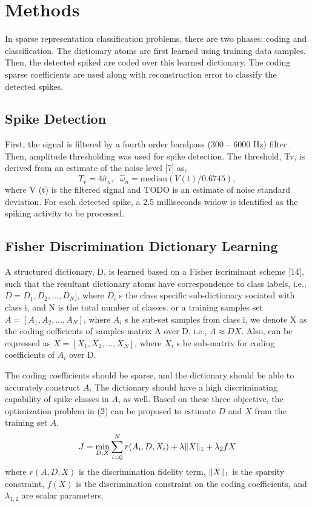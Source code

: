\documentclass[conference]{IEEEtran}
\begin{document}
	\section{Methods}
	In sparse representation classification problems, there are two phases: coding and classification. The dictionary atoms are first learned using training data samples. Then, the detected spiked are coded over this learned dictionary. The coding sparse coefficients are used along with reconstruction error to classify the detected spikes.
	
	\subsection{Spike Detection}
	First, the signal is filtered by a fourth order bandpass (300 – 6000 Hz) filter. Then, amplitude thresholding was used for spike detection. The threshold, Tv, is derived from an estimate of the noise level [7] as,
	\begin{equation}
		T_v=4\hat{\sigma}_n,\;\;\hat{\omega}_n=\mathrm{median}(V(t)/0.6745),
	\end{equation}
	where V (t) is the filtered signal and TODO is an estimate of noise standard deviation. For each detected spike, a 2.5 milliseconds widow is identified as the spiking activity to be processed.
	
	\subsection{Fisher Discrimination Dictionary Learning}
	A structured dictionary, D, is learned based on a Fisher iscriminant scheme [14], such that the resultant dictionary atoms have correspondence to class labels, i.e., $D = D_1, D_2, ..., D_N]$, where $D_i$ s the class specific sub-dictionary sociated with class i, and N is the total number of classes. or a training samples set $A = [A_1, A_2, ..., A_N]$, where $A_i$ s he sub-set samples from class i, we denote X as the coding oefficients of samples matrix A over D, i.e., $A \approx DX$. Also,  can be expressed as $X = [X_1, X_2, ..., X_N]$, where $X_i$ s he sub-matrix for coding coefficients of $A_i$ over D.
	
	The coding coefficients should be sparse, and the dictionary should be able to accurately construct $A$. The dictionary should have a high discriminating capability of spike classes in $A$, as well. Based on these three objective, the optimization problem in (2) can be proposed to estimate $D$ and $X$ from the training set $A$.
	\begin{equation}
		J=\min_{D,X}\sum_{i=0}^{N}r(A_i,D,X_i)+\lambda\Vert{X}\Vert_1+\lambda_2f{X}
	\end{equation}
	where $r(A, D, X)$ is the discrimination fidelity term, $\Vert{X}\Vert_1$ is the sparsity constraint, $f(X)$ is the discrimination constraint on the coding coefficients, and $\lambda_{1,2}$ are scalar parameters.
	
\end{document}
